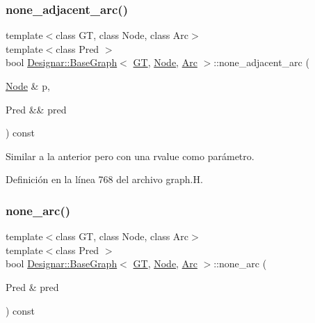 \subsubsection{\texorpdfstring{none\+\_\+adjacent\+\_\+arc()}{none\_adjacent\_arc()}\hspace{0.1cm}{\footnotesize\ttfamily [2/2]}}
{\footnotesize\ttfamily template$<$class GT, class Node, class Arc$>$ \\
template$<$class Pred $>$ \\
bool \hyperlink{class_designar_1_1_base_graph}{Designar\+::\+Base\+Graph}$<$ \hyperlink{demo-buildgraph_8_c_a3001c40d2c31ca87ed96cd7d1334a55e}{GT}, \hyperlink{namespace_designar_a5af326c65aa2bd26b26c410f2030d09e}{Node}, \hyperlink{namespace_designar_a3f55fb5513d62ff47cbc8f72b8e95d6f}{Arc} $>$\+::none\+\_\+adjacent\+\_\+arc (\begin{DoxyParamCaption}\item[{\hyperlink{namespace_designar_a5af326c65aa2bd26b26c410f2030d09e}{Node} \&}]{p,  }\item[{Pred \&\&}]{pred }\end{DoxyParamCaption}) const\hspace{0.3cm}{\ttfamily [inline]}}



Similar a la anterior pero con una rvalue como parámetro. 



Definición en la línea 768 del archivo graph.\+H.

\mbox{\label{class_designar_1_1_base_graph_a023f28dd8824ba7a0c26342effd0fddf}} 
\subsubsection{\texorpdfstring{none\+\_\+arc()}{none\_arc()}\hspace{0.1cm}{\footnotesize\ttfamily [1/2]}}
{\footnotesize\ttfamily template$<$class GT, class Node, class Arc$>$ \\
template$<$class Pred $>$ \\
bool \hyperlink{class_designar_1_1_base_graph}{Designar\+::\+Base\+Graph}$<$ \hyperlink{demo-buildgraph_8_c_a3001c40d2c31ca87ed96cd7d1334a55e}{GT}, \hyperlink{namespace_designar_a5af326c65aa2bd26b26c410f2030d09e}{Node}, \hyperlink{namespace_designar_a3f55fb5513d62ff47cbc8f72b8e95d6f}{Arc} $>$\+::none\+\_\+arc (\begin{DoxyParamCaption}\item[{Pred \&}]{pred }\end{DoxyParamCaption}) const\hspace{0.3cm}{\ttfamily [inline]}}



